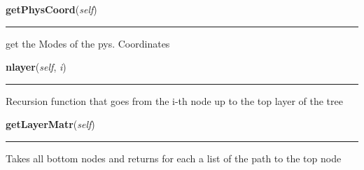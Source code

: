     \label{GUI:ModelTree:ModelTree:getPhysCoord}

    \vspace{0.5ex}

\hspace{.8\funcindent}\begin{boxedminipage}{\funcwidth}

    \raggedright \textbf{getPhysCoord}(\textit{self})

    \vspace{-1.5ex}

    \rule{\textwidth}{0.5\fboxrule}
\setlength{\parskip}{2ex}
    get the Modes of the pys. Coordinates

\setlength{\parskip}{1ex}
    \end{boxedminipage}

    \label{GUI:ModelTree:ModelTree:nlayer}

    \vspace{0.5ex}

\hspace{.8\funcindent}\begin{boxedminipage}{\funcwidth}

    \raggedright \textbf{nlayer}(\textit{self}, \textit{i})

    \vspace{-1.5ex}

    \rule{\textwidth}{0.5\fboxrule}
\setlength{\parskip}{2ex}
    Recursion function that goes from the i-th node up to the top layer of 
    the tree

\setlength{\parskip}{1ex}
    \end{boxedminipage}

    \label{GUI:ModelTree:ModelTree:getLayerMatr}

    \vspace{0.5ex}

\hspace{.8\funcindent}\begin{boxedminipage}{\funcwidth}

    \raggedright \textbf{getLayerMatr}(\textit{self})

    \vspace{-1.5ex}

    \rule{\textwidth}{0.5\fboxrule}
\setlength{\parskip}{2ex}
    Takes all bottom nodes and returns for each a list of the path to the 
    top node

\setlength{\parskip}{1ex}
    \end{boxedminipage}

